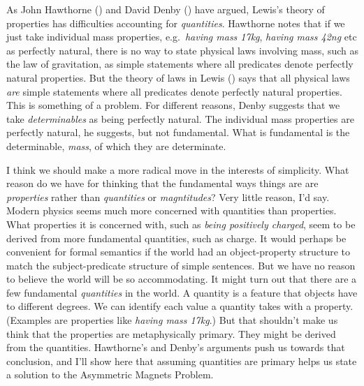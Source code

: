 \documentclass[
  11pt,
  letterpaper,
  DIV=11,
  numbers=noendperiod,
  twoside]{scrartcl}
\begin{document}
As John Hawthorne () and David Denby
() have argued, Lewis's theory of
properties has difficulties accounting for \emph{quantities}. Hawthorne
notes that if we just take individual mass properties, e.g.~\emph{having
mass 17kg}, \emph{having mass 42ng} etc as perfectly natural, there is
no way to state physical laws involving mass, such as the law of
gravitation, as simple statements where all predicates denote perfectly
natural properties. But the theory of laws in Lewis
() says that all physical laws
\emph{are} simple statements where all predicates denote perfectly
natural properties. This is something of a problem. For different
reasons, Denby suggests that we take \emph{determinables} as being
perfectly natural. The individual mass properties are perfectly natural,
he suggests, but not fundamental. What is fundamental is the
determinable, \emph{mass}, of which they are determinate.

I think we should make a more radical move in the interests of
simplicity. What reason do we have for thinking that the fundamental
ways things are are \emph{properties} rather than \emph{quantities} or
\emph{magntitudes}? Very little reason, I'd say. Modern physics seems
much more concerned with quantities than properties. What properties it
is concerned with, such as \emph{being positively charged}, seem to be
derived from more fundamental quantities, such as charge. It would
perhaps be convenient for formal semantics if the world had an
object-property structure to match the subject-predicate structure of
simple sentences. But we have no reason to believe the world will be so
accommodating. It might turn out that there are a few fundamental
\emph{quantities} in the world. A quantity is a feature that objects
have to different degrees. We can identify each value a quantity takes
with a property. (Examples are properties like \emph{having mass 17kg}.)
But that shouldn't make us think that the properties are metaphysically
primary. They might be derived from the quantities. Hawthorne's and
Denby's arguments push us towards that conclusion, and I'll show here
that assuming quantities are primary helps us state a solution to the
Asymmetric Magnets Problem.
\end{document}
